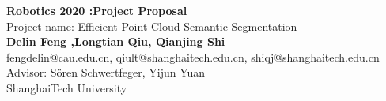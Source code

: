 \documentclass{article}
\begin{document}
	\begin{center}
    
    
		\LARGE{\textbf{Robotics 2020 :Project Proposal}} \\
        \vspace{1em}
        \Large{Project name:  Efficient Point-Cloud Semantic Segmentation} \\
        \vspace{1em}
        \normalsize\textbf{Delin Feng ,Longtian Qiu, Qianjing Shi} \\
        \normalsize{fengdelin@cau.edu.cn, qiult@shanghaitech.edu.cn, shiqj@shanghaitech.edu.cn} \\
        \vspace{1em}
        \normalsize{Advisor: Sören Schwertfeger, Yijun Yuan} \\
        \vspace{1em}
        \normalsize{ShanghaiTech University} \\
     
	\end{center}
\end{document}
